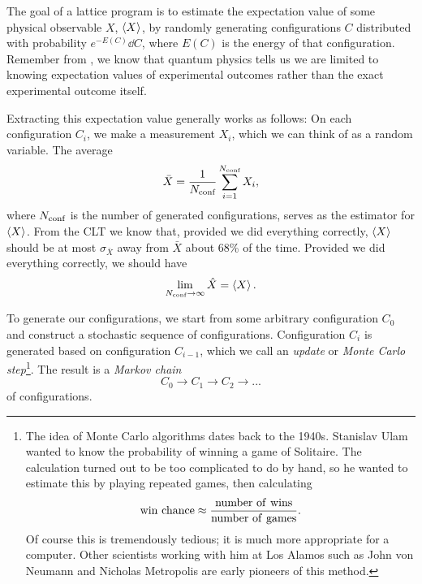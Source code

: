 The goal of a lattice program is to estimate the expectation value of some
physical observable $X$, $\ev{X}$, by randomly generating configurations $C$
distributed with probability $e^{-E(C)}\dd C$, where $E(C)$ is the energy of that
configuration. Remember from , we know that quantum physics tells
us we are limited to knowing expectation values of experimental outcomes rather
than the exact experimental outcome itself.

Extracting this expectation value generally works as follows:
On each configuration $C_i$, we make a measurement $X_i$, which we can think of
as a random variable. The average
\begin{equation}\label{eq:arithmeticaverage}
  \bar{X}=\frac{1}{N_{\text{conf}}}\sum_{i=1}^{N_{\text{conf}}} X_i,
\end{equation}
where $N_{\text{conf}}$ is the number of generated configurations,
serves as the estimator for $\ev{X}$. From the CLT 
we know that, provided we did everything correctly, $\ev{X}$ should
be at most $\sigma_{\bar{X}}$ away from $\bar{X}$ about 68\% of the time.
Provided we did everything correctly, we should have
\begin{equation}
\lim_{\nconf\to\infty}\hat{X}=\ev{X}.
\end{equation}

To generate our configurations, we start from some arbitrary configuration
$C_0$ and construct a stochastic sequence of configurations.
Configuration $C_i$ is generated based on
configuration $C_{i-1}$, which we call an {\it update} or {\it Monte Carlo
step}\footnote{The idea of Monte Carlo algorithms dates back to the 1940s.
Stanislav Ulam wanted to know the probability of winning a game of Solitaire.
The calculation turned out to be too complicated to do by hand, so he wanted to
estimate this by playing repeated games, then calculating
$$
{\rm win\ chance}\approx\frac{\rm number\ of\ wins}{\rm number\ of\ games}.
$$
Of course this is tremendously tedious; it is much more appropriate for a
computer. Other scientists working with him at Los Alamos such as John von
Neumann and Nicholas Metropolis are early pioneers of this method.}.
The result is a {\it Markov chain}
\begin{equation}\label{eq:markov}
  C_0\to C_1\to C_2\to...
\end{equation}
of configurations.

